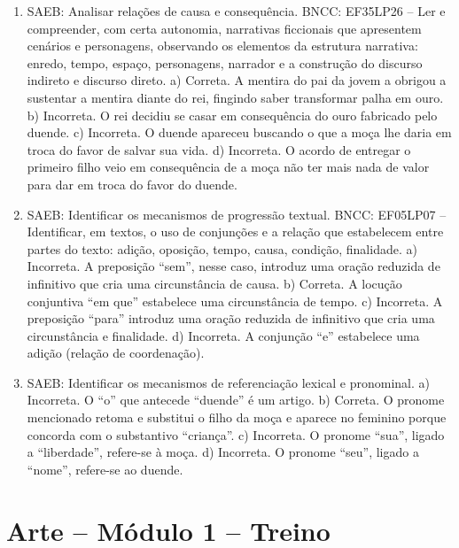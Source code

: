 \begin{enumerate}
\item
SAEB: Analisar relações de causa e consequência. BNCC:
EF35LP26 – Ler e compreender, com certa autonomia, narrativas ficcionais que apresentem
cenários e personagens, observando os elementos da estrutura narrativa: enredo, tempo, espaço,
personagens, narrador e a construção do discurso indireto e discurso direto.
a) Correta. A mentira do pai da jovem a obrigou a sustentar a mentira
diante do rei, fingindo saber transformar palha em ouro.
b) Incorreta. O rei decidiu se casar em consequência do ouro fabricado
pelo duende.
c) Incorreta. O duende apareceu buscando o que a moça lhe daria em troca
do favor de salvar sua vida.
d) Incorreta. O acordo de entregar o primeiro filho veio em consequência
de a moça não ter mais nada de valor para dar em troca do favor do
duende.

\item
SAEB: Identificar os mecanismos de progressão textual. BNCC:
EF05LP07 – Identificar, em textos, o uso de conjunções e a relação
que estabelecem entre partes do texto: adição, oposição, tempo, causa,
condição, finalidade.
a) Incorreta. A preposição “sem”, nesse caso, introduz uma oração reduzida de infinitivo que cria uma circunstância de causa.
b) Correta. A locução conjuntiva “em que” estabelece uma circunstância de tempo.
c) Incorreta. A preposição “para” introduz uma oração reduzida de infinitivo que cria uma circunstância e finalidade.
d) Incorreta. A conjunção “e” estabelece uma adição (relação de coordenação).

\item
SAEB: Identificar os mecanismos de referenciação lexical e pronominal.
a) Incorreta. O “o” que antecede “duende” é um artigo.
b) Correta. O pronome mencionado retoma e substitui o filho da moça e aparece no feminino porque concorda com o substantivo “criança”.
c) Incorreta. O pronome “sua”, ligado a “liberdade”, refere-se à moça.
d) Incorreta. O pronome “seu”, ligado a “nome”, refere-se ao duende.
\end{enumerate}

\section*{Arte – Módulo 1 –  Treino}

